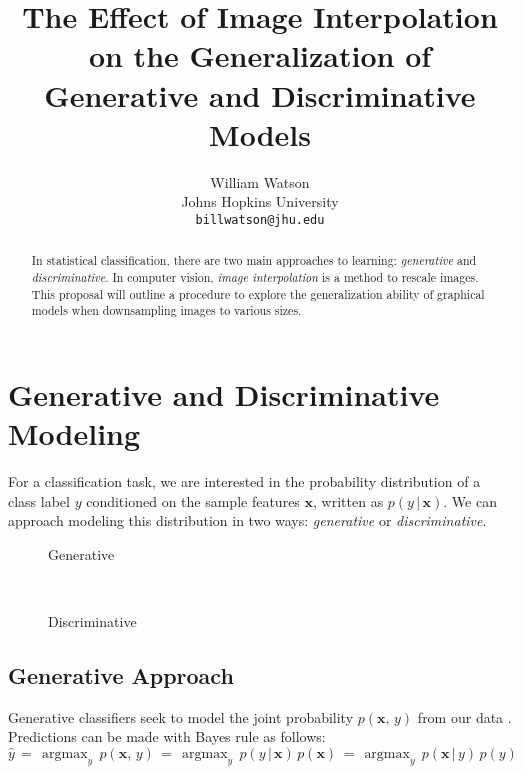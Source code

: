\documentclass{article}
\title{The Effect of Image Interpolation on the Generalization of Generative and Discriminative Models}
\author{%
  William Watson \\
  Johns Hopkins University\\
  \texttt{billwatson@jhu.edu} \\
}
\DeclareMathOperator*{\argmax}{argmax}
\begin{document}

\maketitle

\begin{abstract}
  In statistical classification, there are two main approaches to learning:
  \textit{generative} and \textit{discriminative}. In computer vision,
  \textit{image interpolation} is a method to rescale images. This proposal will
  outline a procedure to explore the generalization ability of graphical models
  when downsampling images to various sizes.
\end{abstract}

\section{Generative and Discriminative Modeling}
For a classification task, we are interested in the probability distribution
of a class label $y$ conditioned on the sample features $\mathbf{x}$,
written as $p(y\,|\,\mathbf{x})$. We can approach modeling this
distribution in two ways: \textit{generative} or \textit{discriminative}.

\begin{figure*}[h!]
    \centering
    \begin{subfigure}[t]{0.15\textwidth}
        \centering
        \caption*{Generative}
    \end{subfigure}%
    ~
    \begin{subfigure}[t]{0.15\textwidth}
        \centering
        \caption*{Discriminative}
    \end{subfigure}
\end{figure*}

\subsection{Generative Approach}
Generative classifiers seek to
model the joint probability $p(\mathbf{x},\, y)$ from our data \cite{NgJordan}.
Predictions can be made with Bayes rule as follows:
\begin{equation}
  \hat{y} \,=\, \argmax_y \, p(\mathbf{x}, \,y) \,=\, \argmax_y \, p(y \,|\, \mathbf{x}) \, p(\mathbf{x}) \,=\, \argmax_y \, p(\mathbf{x} \,|\, y) \, p(y)
\end{equation}
\end{document}
